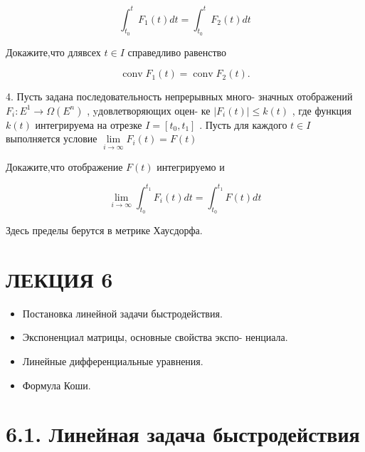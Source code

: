 \documentclass[8pt]{extarticle}
\begin{document}
\[
{\int }_{{t}_{0}}^{t}{F}_{1}\left( t\right) {dt} = {\int }_{{t}_{0}}^{t}{F}_{2}\left( t\right) {dt}
\]

Докажите,что длявсех \(t \in  I\) справедливо равенство

\[
\operatorname{conv}{F}_{1}\left( t\right)  = \operatorname{conv}{F}_{2}\left( t\right) .
\]

4. Пусть задана последовательность непрерывных много- значных отображений \({F}_{i} : {E}^{1} \rightarrow  \Omega \left( {E}^{n}\right)\) , yдовлетворяющих оцен- ке \(\left| {{F}_{i}\left( t\right) }\right|  \leq  k\left( t\right)\) , где функция \(k\left( t\right)\) интегрируема на отрезке \(I = \left\lbrack  {{t}_{0},{t}_{1}}\right\rbrack\) . Пусть для каждого \(t \in  I\) выполняется условие \(\mathop{\lim }\limits_{{i \rightarrow  \infty }}{F}_{i}\left( t\right)  = F\left( t\right)\)

Докажите,что отображение \(F\left( t\right)\) интегрируемо и

\[
\mathop{\lim }\limits_{{i \rightarrow  \infty }}{\int }_{{t}_{0}}^{{t}_{1}}{F}_{i}\left( t\right) {dt} = {\int }_{{t}_{0}}^{{t}_{1}}F\left( t\right) {dt}
\]

Здесь пределы берутся в метрике Хаусдорфа.

\section*{ЛЕКЦИЯ 6}

\begin{itemize}\relax
\item\relax Постановка линейной задачи быстродействия.
\end{itemize}

\begin{itemize}\relax
\item\relax Экспоненциал матрицы, основные свойства экспо- ненциала.
\end{itemize}

\begin{itemize}\relax
\item\relax Линейные дифференциальные уравнения.
\end{itemize}

\begin{itemize}\relax
\item\relax Формула Коши.
\end{itemize}

\section*{6.1. Линейная задача быстродействия}
\end{document}
